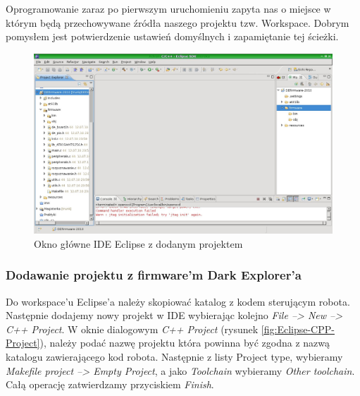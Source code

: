 Oprogramowanie zaraz po pierwszym uruchomieniu zapyta nas o miejsce w którym będą
przechowywane źródła naszego projektu tzw. Workspace. Dobrym pomysłem jest
potwierdzenie ustawień domyślnych i zapamiętanie tej ścieżki.

\begin{figure}[ht!]
 \centering
 \includegraphics[width=150.0mm]{../images/ch03/Eclipse-MainWindow.jpg}
 \caption{Okno główne IDE Eclipse z dodanym projektem}
 \label{fig:Eclipse-MainWindow}
\end{figure}

\subsubsection{Dodawanie projektu z firmware'm Dark Explorer'a}
Do workspace'u Eclipse'a należy skopiować katalog z kodem sterującym robota.
Następnie dodajemy nowy projekt w IDE wybierając kolejno \textit{File --> New -->
C++ Project}. W oknie dialogowym \textit{C++ Project} (rysunek
\ref{fig:Eclipse-CPP-Project}), należy podać nazwę projektu która powinna być
zgodna z nazwą katalogu zawierającego kod robota. Następnie z listy Project type,
wybieramy \textit{Makefile project --> Empty Project}, a jako \textit{Toolchain}
wybieramy \textit{Other toolchain}. Całą operację zatwierdzamy przyciskiem
\textit{Finish}.

